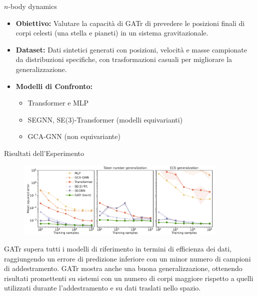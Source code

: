 \begin{frame}{\( n \)-body dynamics}
    \begin{itemize}
        \item \textbf{Obiettivo:} Valutare la capacità di GATr di prevedere le posizioni finali di corpi celesti (una stella e pianeti) in un sistema gravitazionale.
        \item \textbf{Dataset:} Dati sintetici generati con posizioni, velocità e masse campionate da distribuzioni specifiche, con trasformazioni casuali per migliorare la generalizzazione.
        \item \textbf{Modelli di Confronto:}
        \begin{itemize}
            \item Transformer e MLP
            \item SEGNN, SE(3)-Transformer (modelli equivarianti)
            \item GCA-GNN (non equivariante)
        \end{itemize}
    \end{itemize}
    
\end{frame}

\begin{frame}{Risultati dell'Esperimento}
    \begin{figure}
        \centering
        \includegraphics[width=0.9\textwidth]{../Images/n-body.png}
    \end{figure}

    GATr supera tutti i modelli di riferimento  in termini di efficienza dei dati, 
    raggiungendo un errore di predizione inferiore con un minor numero di campioni di 
    addestramento. GATr mostra anche una buona generalizzazione, ottenendo risultati 
    promettenti su sistemi con un numero di corpi maggiore rispetto a quelli utilizzati 
    durante l'addestramento e su dati traslati nello spazio.
\end{frame}

